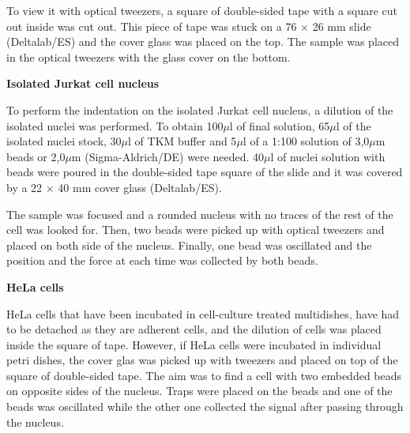 \documentclass[12pt, a4paper]{article} %
\begin{document}
	\setlength{\parskip}{4mm}
	
	To view it with optical tweezers, a square of double-sided tape with a square cut out inside was cut out. This piece of tape was stuck on a 76 $\times$ 26 mm slide (Deltalab/ES) and the cover glass was placed on the top. The sample was placed in the optical tweezers with the glass cover on the bottom.
	
	\setlength{\parindent}{0pt}
	
	{\textbf{Isolated Jurkat cell nucleus}}
	
	To perform the indentation on the isolated Jurkat cell nucleus, a dilution of the isolated nuclei was performed. To obtain 100$\mu$l of final solution, 65$\mu$l of the isolated nuclei stock, 30$\mu$l of TKM buffer and 5$\mu$l of a 1:100 solution of 3,0$\mu$m beads or 2,0$\mu$m (Sigma-Aldrich/DE) were needed. 40$\mu$l of nuclei solution with beads were poured in the double-sided tape square of the slide and it was covered by a 22 $\times$ 40 mm cover glass (Deltalab/ES).
	
	\setlength{\parindent}{8pt}
	
	The sample was focused and a rounded nucleus with no traces of the rest of the cell was looked for. Then, two beads were picked up with optical tweezers and placed on both side of the nucleus. Finally, one bead was oscillated and the position and the force at each time was collected by both beads.
	
	\setlength{\parindent}{0pt}
	
	\newpage
	
	{\textbf{HeLa cells}}
	
	HeLa cells that have been incubated in cell-culture treated multidishes, have had to be detached as they are adherent cells, and the dilution of cells was placed inside the square of tape. However, if HeLa cells were incubated in individual petri dishes, the cover glas was picked up with tweezers and placed on top of the square of double-sided tape. The aim was to find a cell with two embedded beads on opposite sides of the nucleus. Traps were placed on the beads and one of the beads was oscillated while the other one collected the signal after passing through the nucleus.
	
\end{document}
